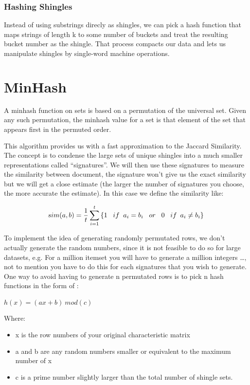 \documentclass[12pt]{article}
\begin{document}
\subsubsection{Hashing Shingles}

Instead of using substrings direcly as shingles, we can pick a hash function that maps strings of length k to some number of buckets and treat the resulting bucket number as the shingle. That process compacts our data and lets us manipulate shingles by single-word machine operations.

\section{MinHash}

A minhash function on sets is based on a permutation of the universal set. Given any such permutation, the minhash value for a set is that element of the set that appears first in the permuted order. 

This algorithm provides us with a fast approximation to the Jaccard Similarity. The concept is to condense the large sets of unique shingles into a much smaller representations called ``signatures''. We will then use these signatures to measure the similarity between document, the signature won't give us the exact similarity but we will get a close estimate (the larger the number of signatures you choose, the more accurate the estimate). In this case we define the similarity like: 
 \medskip

$$  sim(a,b) = \frac{1}{t} \sum_{i=1}^{t}\left\{
1  \; \; \;  if \; \;  a_{i} = b_{i} \\
\; \; \;  or \; \; \;  0 \; \; \;   if\: \;  a_{i} \neq  b_{i} 
\}\right.  $$\medskip


To implement the idea of generating randomly permutated rows, we don’t actually generate the random numbers, since it is not feasible to do so for large datasets, e.g. For a million itemset you will have to generate a million integers …, not to mention you have to do this for each signatures that you wish to generate. One way to avoid having to generate n permutated rows is to pick n hash functions in the form of :
\medbreak
\begin{center}
$ h(x)=(ax+b)\  mod(c)$
\end{center}

Where: 
\begin{itemize}
\item x is the row numbers of your original characteristic matrix
\item a and b are any random numbers smaller or equivalent to the maximum number of x 
\item c is a prime number slightly larger than the total number of shingle sets. 
\end{itemize}
\end{document}
